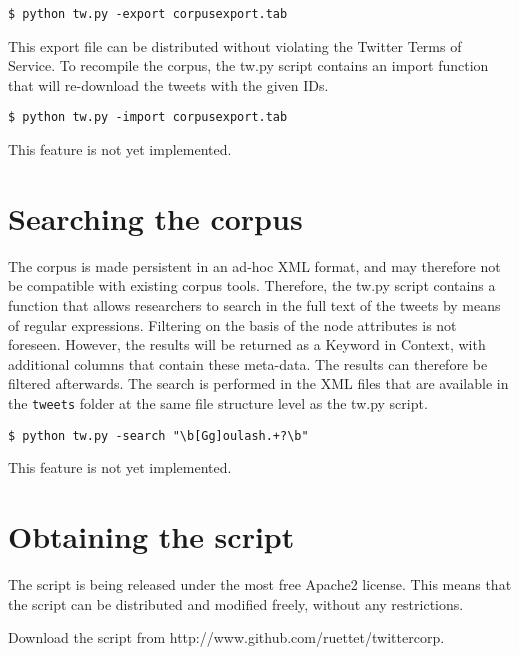 \documentclass[a4paper,11pt]{article}
\begin{document}
\begin{verbatim}
$ python tw.py -export corpusexport.tab
\end{verbatim}

This export file can be distributed without violating the Twitter Terms of Service. To recompile the corpus, the tw.py script contains an import function that will re-download the tweets with the given IDs.

\begin{verbatim}
$ python tw.py -import corpusexport.tab
\end{verbatim}

This feature is not yet implemented.

\section{Searching the corpus}

The corpus is made persistent in an ad-hoc XML format, and may therefore not be compatible with existing corpus tools. Therefore, the tw.py script contains a function that allows researchers to search in the full text of the tweets by means of regular expressions. Filtering on the basis of the node attributes is not foreseen. However, the results will be returned as a Keyword in Context, with additional columns that contain these meta-data. The results can therefore be filtered afterwards. The search is performed in the XML files that are available in the \texttt{tweets} folder at the same file structure level as the tw.py script.

\begin{verbatim}
$ python tw.py -search "\b[Gg]oulash.+?\b"
\end{verbatim}

This feature is not yet implemented.

\section{Obtaining the script}

The script is being released under the most free Apache2 license. This means that the script can be distributed and modified freely, without any restrictions.

Download the script from http://www.github.com/ruettet/twittercorp.

\end{document}
